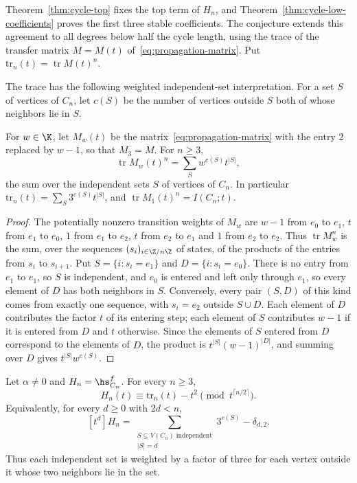 Theorem~\ref{thm:cycle-top} fixes the top term of $H_n$, and
Theorem~\ref{thm:cycle-low-coefficients} proves the first three stable
coefficients. The conjecture extends this agreement to all degrees below
half the cycle length, using the trace of the transfer matrix
$M=M(t)$ of~\eqref{eq:propagation-matrix}. Put
$\mathrm{tr}_n(t)=\operatorname{tr}M(t)^n$.

The trace has the following weighted independent-set interpretation. For a set $S$ of vertices
of $C_n$, let $c(S)$ be the number of vertices outside $S$ both of whose
neighbors lie in $S$.

\begin{proposition}
\label{prop:cycle-weighted-independence}
For $w\in\K$, let $M_w(t)$ be the matrix~\eqref{eq:propagation-matrix}
with the entry $2$ replaced by $w-1$, so that $M_3=M$. For $n\ge3$,
\[
 \operatorname{tr}M_w(t)^n=\sum_{S}w^{c(S)}t^{|S|},
\]
the sum over the independent sets $S$ of vertices of $C_n$. In
particular $\mathrm{tr}_n(t)=\sum_S3^{c(S)}t^{|S|}$, and
$\operatorname{tr}M_1(t)^n=I(C_n;t)$.
\end{proposition}
\begin{proof}
The potentially nonzero transition weights of $M_w$ are $w-1$ from $e_0$ to $e_1$, $t$
from $e_1$ to $e_0$, $1$ from $e_1$ to $e_2$, $t$ from $e_2$ to $e_1$
and $1$ from $e_2$ to $e_2$. Thus $\operatorname{tr}M_w^n$ is the sum,
over the sequences $(s_i)_{i\in\Z/n\Z}$ of states, of the products of the
entries from $s_i$ to $s_{i+1}$. Put $S=\{i:s_i=e_1\}$ and
$D=\{i:s_i=e_0\}$. There is no entry from $e_1$ to $e_1$, so $S$ is
independent, and $e_0$ is entered and left only through $e_1$, so every
element of $D$ has both neighbors in $S$. Conversely, every pair $(S,D)$
of this kind comes from exactly one sequence, with $s_i=e_2$ outside
$S\cup D$. Each element of $D$ contributes the factor $t$ of its
entering step; each element of $S$ contributes $w-1$ if it is entered
from $D$ and $t$ otherwise. Since the elements of $S$ entered from $D$
correspond to the elements of $D$, the product is
$t^{|S|}(w-1)^{|D|}$, and summing over $D$ gives $t^{|S|}w^{c(S)}$.
\end{proof}

\begin{conjecture}
\label{conj:cycles}
Let $\alpha\ne0$ and $H_n=\hs^f_{C_n}$. For every $n\ge3$,
\begin{equation}\label{eq:cycle-stable-congruence}
H_n(t)\equiv \mathrm{tr}_n(t)-t^2\pmod{t^{\lceil n/2\rceil}}.
\end{equation}
Equivalently, for every $d\ge0$ with $2d<n$,
\[
 [t^d]H_n=\sum_{\substack{S\subseteq V(C_n)\text{ independent}\\|S|=d}}
            3^{c(S)}-\delta_{d,2}.
\]
Thus each independent set is weighted by a factor of three for each
vertex outside it whose two neighbors lie in the set.
\end{conjecture}

